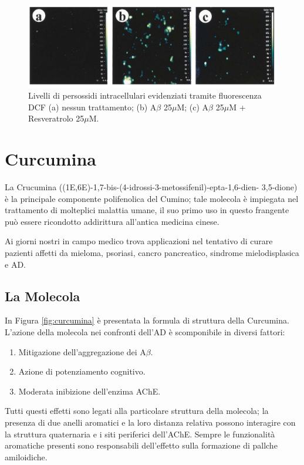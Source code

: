 \documentclass[a4paper, 12pt]{article}
\begin{document}
\begin{figure}[H]
	\centering
	\includegraphics[width=\linewidth]{immagini/roi_resveratrolo.png}
	\caption{Livelli di persossidi intracellulari evidenziati tramite fluorescenza DCF (a) nessun trattamento; (b) A$\beta$ 25$\mu$M; (c) A$\beta$ 25$\mu$M + Resveratrolo 25$\mu$M.}
	\label{fig:roi_resveratrolo}
\end{figure}

\section{Curcumina}
\label{sec:curc}
La Crucumina ((1E,6E)-1,7-bis-(4-idrossi-3-metossifenil)-epta-1,6-dien-
3,5-dione) è la principale componente polifenolica del Cumino; tale molecola è impiegata nel trattamento di molteplici malattia umane, il suo primo uso in questo frangente può essere ricondotto addirittura all'antica medicina cinese.

Ai giorni nostri in campo medico trova applicazioni nel tentativo di curare pazienti affetti da mieloma, psoriasi, cancro pancreatico, sindrome mielodisplasica e AD.

\subsection{La Molecola}
In Figura \ref{fig:curcumina} è presentata la formula di struttura della Curcumina. L'azione della molecola nei confronti dell'AD è scomponibile in diversi fattori:

\begin{enumerate}
	\item Mitigazione dell'aggregazione dei A$\beta$.
	\item Azione di potenziamento cognitivo.
	\item Moderata inibizione dell'enzima AChE.
\end{enumerate}

Tutti questi effetti sono legati alla particolare struttura della molecola; la presenza di due anelli aromatici e la loro distanza relativa possono interagire con la struttura quaternaria  e i siti periferici dell'AChE. Sempre le funzionalità aromatiche presenti sono responsabili dell'effetto sulla formazione di pallche amiloidiche.
\end{document}
